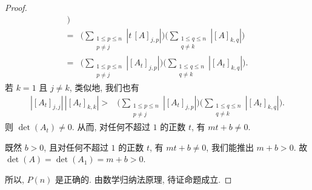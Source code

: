\begin{proof}
\begin{align*}
        \Bigg)
        \\
        = {}    &
        \Bigg(
        \sum_{\substack{1 \leq p \leq n \\
                p \neq j}} {|t\, [A]_{j,p}|}
        \Bigg)
        \Bigg(
        \sum_{\substack{1 \leq q \leq n \\
                q \neq k}} {|[A]_{k,q}|}
        \Bigg)
        \\
        = {}    &
        \Bigg(
        \sum_{\substack{1 \leq p \leq n \\
                p \neq j}} {|[A_t]_{j,p}|}
        \Bigg)
        \Bigg(
        \sum_{\substack{1 \leq q \leq n \\
                q \neq k}} {|[A_t]_{k,q}|}
        \Bigg).
    \end{align*}
    若 \(k = 1\) 且 \(j \neq k\),
    类似地, 我们也有
    \begin{align*}
        |[A_t]_{j,j}|\,|[A_t]_{k,k}|
        > {} &
        \Bigg(
        \sum_{\substack{1 \leq p \leq n \\
                p \neq j}} {|[A_t]_{j,p}|}
        \Bigg)
        \Bigg(
        \sum_{\substack{1 \leq q \leq n \\
                q \neq k}} {|[A_t]_{k,q}|}
        \Bigg).
    \end{align*}
    则 \(\det {(A_t)} \neq 0\).
    从而,
    对任何不超过 \(1\) 的正数 \(t\),
    有 \(mt + b \neq 0\).

    既然 \(b > 0\),
    且对任何不超过 \(1\) 的正数 \(t\),
    有 \(mt + b \neq 0\),
    我们能推出 \(m + b > 0\).
    故 \(\det {(A)} = \det {(A_1)} = m + b > 0\).

    所以, \(P(n)\) 是正确的.
    由数学归纳法原理, 待证命题成立.
\end{proof}

